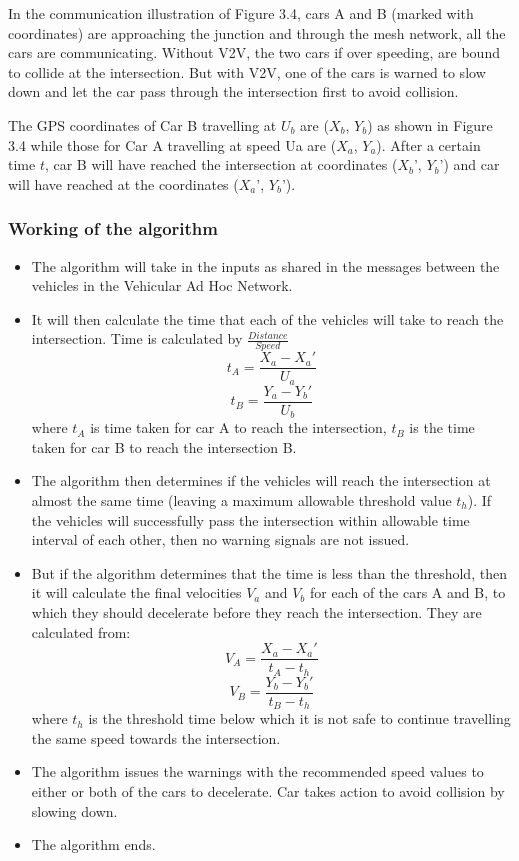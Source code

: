 \documentclass[12pt]{report}
\begin{document}
In the communication illustration of Figure 3.4, cars A and B (marked with coordinates) are approaching the junction and through the mesh network, all the cars are communicating. Without V2V, the two cars if over speeding, are bound to collide at the intersection. But with V2V, one of the cars is warned to slow down and let the car pass through the intersection first to avoid collision.

The GPS coordinates of Car B travelling at $U_b$ are ($X_b$, $Y_b$) as shown in Figure 3.4 while those for Car A travelling at speed Ua are ($X_a$, $Y_a$). After a certain time $t$, car B will have reached the intersection at coordinates ($X_b$', $Y_b$') and car will have reached at the coordinates ($X_a$', $Y_b$').

\subsubsection{Working of the algorithm}
\begin{itemize}
	\item The algorithm will take in the inputs as shared in the messages between the vehicles in the Vehicular Ad Hoc Network. 
	\item It will then calculate the time that each of the vehicles will take to reach the intersection. Time is calculated by $\frac{Distance}{Speed}$
	\begin{equation}
		t_A = \frac{X_a - X_a'}{U_a}
	\end{equation}
	\begin{equation}
		t_B = \frac{Y_a - Y_b'}{U_b}
	\end{equation}
	where $t_A$ is time taken for car A to reach the intersection, $t_B$ is the time taken for car B to reach the intersection B. 
	\item The algorithm then determines if the vehicles will reach the intersection at almost the same time (leaving a maximum allowable threshold value $t_h$). If the vehicles will successfully pass the intersection within allowable time interval of each other, then no warning signals are not issued.
	\item But if the algorithm determines that the time is less than the threshold, then it will calculate the final velocities $V_a$ and $V_b$ for each of the cars A and B, to which they should decelerate before they reach the intersection.
	 They are calculated from: 
	\begin{equation}
		V_A = \frac{X_a - X_a'}{t_A - t_h}
	\end{equation}
	\begin{equation}
		V_B = \frac{Y_b - Y_b'}{t_B - t_h}
	\end{equation}
	where $t_h$ is the threshold time below which it is not safe to continue travelling the same speed towards the intersection.
	\item The algorithm issues the warnings with the recommended speed values to either or both of the cars to decelerate. Car takes action to avoid collision by slowing down.
	\item The algorithm ends.
\end{itemize}
\end{document}
